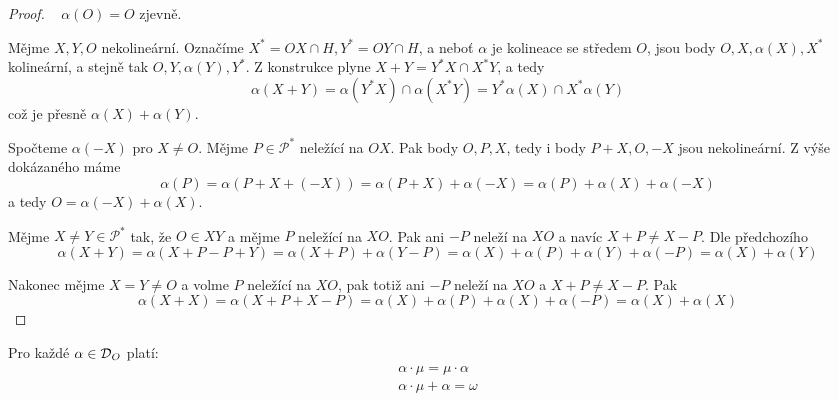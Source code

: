\begin{proof}~
    $\alpha(O)=O$ zjevně.

    Mějme $X,Y,O$ nekolineární.
    Označíme $X^*=OX\cap H, Y^*=OY\cap H$, a neboť $\alpha$ je kolineace se středem $O$, jsou body $O,X,\alpha(X),X^*$ kolineární, a stejně tak $O,Y,\alpha(Y),Y^*$.
    Z konstrukce plyne $X+Y=Y^*X\cap X^*Y$, a tedy
    \[ \alpha(X+Y)=\alpha(Y^*X)\cap\alpha(X^*Y)=Y^*\alpha(X)\cap X^*\alpha(Y)\]
    což je přesně $\alpha(X)+\alpha(Y)$.

    Spočteme $\alpha(-X)$ pro $X\neq O$.
    Mějme $P\in\mathcal P^*$ neležící na $OX$.
    Pak body $O,P,X$, tedy i body $P+X, O, -X$ jsou nekolineární.
    Z výše dokázaného máme
    \[ \alpha(P)=\alpha(P + X + (-X))=\alpha(P+X) + \alpha(-X) = \alpha(P) + \alpha(X) + \alpha(-X)\]
    a tedy $O=\alpha(-X)+\alpha(X)$.

    Mějme $X\neq Y\in\mathcal P^*$ tak, že $O\in XY$ a mějme $P$ neležící na $XO$.
    Pak ani $-P$ neleží na $XO$ a navíc $X+P\neq X-P$.
    Dle předchozího
    \[ \alpha(X+Y)=\alpha(X+P-P+Y)=\alpha(X+P) + \alpha(Y-P) = \alpha(X) + \alpha(P) + \alpha(Y) + \alpha(-P) = \alpha(X)+\alpha(Y) \]

    Nakonec mějme $X=Y\neq O$ a volme $P$ neležící na $XO$, pak totiž ani $-P$ neleží na $XO$ a $X+P\neq X-P$.
    Pak
    \[ \alpha(X+X) = \alpha(X+P+X-P) = \alpha(X) + \alpha(P) + \alpha(X) + \alpha(-P)=\alpha(X) + \alpha(X) \]
\end{proof}

\begin{consequence}
	Pro každé $\alpha \in \operatorname{\mathcal{D}}_O$ platí:
	\begin{gather*}
		\alpha \cdot \mu = \mu \cdot \alpha \\
		\alpha \cdot \mu + \alpha = \omega
	\end{gather*}
\end{consequence}

